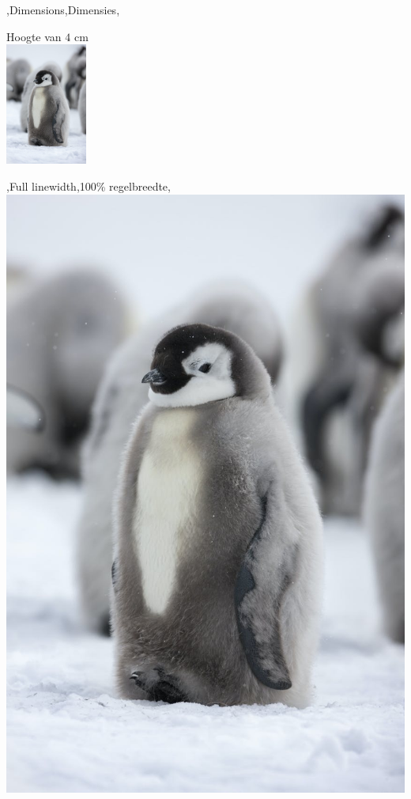 \begin{frame}[fragile]{\lang,Dimensions,Dimensies,}
    \begin{noindentlist}\setlength{\itemsep}{20pt}
        \item Hoogte van $ 4 $ cm\\
        \texttt{\includegraphics[height=4cm]{pinguin.jpg}}

        \item \lang,Full linewidth,100\% regelbreedte,\\
        \texttt{\includegraphics[width=\linewidth]{pinguin.jpg}}
        

\end{noindentlist}
\end{frame}
